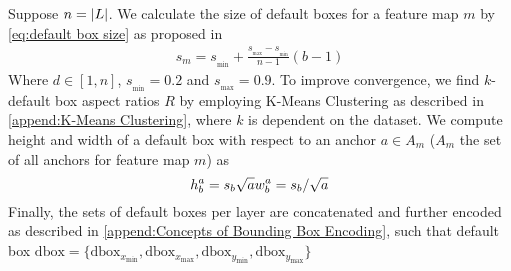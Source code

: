 \label{verysubsect:Default box size and aspect ratio}
Suppose \(n=\abs{L}\). We calculate the size of default boxes for a feature map
\(m\) by \autoref{eq:default box size} as proposed in \cite{Liu.2016}
\begin{align}
    s_m=s_{_\text{min}} + \frac{s_{_\text{max}}-s_{_\text{min}}}{n-1}(b-1)
\end{align}\label{eq:default box size}
Where \(d\in [1, n]\), \(s_{_\text{min}}=0.2\) and \(s_{_\text{max}}=0.9\). To improve 
convergence, we find \(k\)-default box aspect ratios \(R\) by employing K-Means 
Clustering as described in \autoref{append:K-Means Clustering}, where \(k\) is 
dependent on the dataset. We compute 
height and width of a default box with respect to an anchor \(a\in A_m\) (\(A_m\)
the set of all anchors for feature map \(m\)) as
\begin{equation}
    h_b^a=s_b\sqrt{a}\\
    w_b^a=s_b/\sqrt{a}
\end{equation}
Finally, the sets of default boxes per \gls{layer} are concatenated and further
encoded as described in \autoref{append:Concepts of Bounding Box Encoding}, such
that default box
\(\text{dbox} = \{\text{dbox}_{x_\text{min}}, \text{dbox}_{x_\text{max}}, \text{dbox}_{y_\text{min}}, \text{dbox}_{y_\text{max}}\}\)

